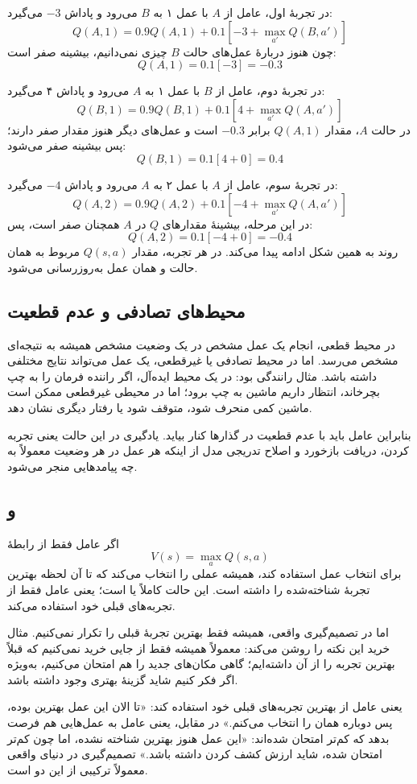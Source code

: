 در تجربهٔ اول، عامل از \(A\) با عمل ۱ به \(B\) می‌رود و پاداش \(-3\) می‌گیرد:
\[
Q(A,1)=0.9Q(A,1)+0.1[-3+\max_{a'}Q(B,a')]
\]
چون هنوز دربارهٔ عمل‌های حالت \(B\) چیزی نمی‌دانیم، بیشینه صفر است:
\[
Q(A,1)=0.1[-3]=-0.3
\]

در تجربهٔ دوم، عامل از \(B\) با عمل ۱ به \(A\) می‌رود و پاداش ۴ می‌گیرد:
\[
Q(B,1)=0.9Q(B,1)+0.1[4+\max_{a'}Q(A,a')]
\]
در حالت \(A\)، مقدار \(Q(A,1)\) برابر \(-0.3\) است و عمل‌های دیگر هنوز مقدار صفر دارند؛ پس بیشینه صفر می‌شود:
\[
Q(B,1)=0.1[4+0]=0.4
\]

در تجربهٔ سوم، عامل از \(A\) با عمل ۲ به \(A\) می‌رود و پاداش \(-4\) می‌گیرد:
\[
Q(A,2)=0.9Q(A,2)+0.1[-4+\max_{a'}Q(A,a')]
\]
در این مرحله، بیشینهٔ مقدارهای \(Q\) در \(A\) همچنان صفر است، پس:
\[
Q(A,2)=0.1[-4+0]=-0.4
\]
روند به همین شکل ادامه پیدا می‌کند. در هر تجربه، مقدار \(Q(s,a)\) مربوط به همان حالت و همان عمل به‌روزرسانی می‌شود.

\subsection{محیط‌های تصادفی و عدم قطعیت}
در محیط قطعی، انجام یک عمل مشخص در یک وضعیت مشخص همیشه به نتیجه‌ای مشخص می‌رسد. اما در محیط تصادفی یا غیرقطعی، یک عمل می‌تواند نتایج مختلفی داشته باشد. مثال رانندگی بود: در یک محیط ایده‌آل، اگر راننده فرمان را به چپ بچرخاند، انتظار داریم ماشین به چپ برود؛ اما در محیطی غیرقطعی ممکن است ماشین کمی منحرف شود، متوقف شود یا رفتار دیگری نشان دهد.

بنابراین عامل باید با عدم قطعیت در گذارها کنار بیاید. یادگیری در این حالت یعنی تجربه کردن، دریافت بازخورد و اصلاح تدریجی مدل از اینکه هر عمل در هر وضعیت معمولاً به چه پیامدهایی منجر می‌شود.

\subsection{ و }
اگر عامل فقط از رابطهٔ
\[
V(s)=\max_a Q(s,a)
\]
برای انتخاب عمل استفاده کند، همیشه عملی را انتخاب می‌کند که تا آن لحظه بهترین تجربهٔ شناخته‌شده را داشته است. این حالت کاملاً  یا  است؛ یعنی عامل فقط از تجربه‌های قبلی خود استفاده می‌کند.

اما در تصمیم‌گیری واقعی، همیشه فقط بهترین تجربهٔ قبلی را تکرار نمی‌کنیم. مثال خرید این نکته را روشن می‌کند: معمولاً همیشه فقط از جایی خرید نمی‌کنیم که قبلاً بهترین تجربه را از آن داشته‌ایم؛ گاهی مکان‌های جدید را هم امتحان می‌کنیم، به‌ویژه اگر فکر کنیم شاید گزینهٔ بهتری وجود داشته باشد.

 یعنی عامل از بهترین تجربه‌های قبلی خود استفاده کند: «تا الان این عمل بهترین بوده، پس دوباره همان را انتخاب می‌کنم.» در مقابل،  یعنی عامل به عمل‌هایی هم فرصت بدهد که کم‌تر امتحان شده‌اند: «این عمل هنوز بهترین شناخته نشده، اما چون کم‌تر امتحان شده، شاید ارزش کشف کردن داشته باشد.» تصمیم‌گیری در دنیای واقعی معمولاً ترکیبی از این دو است.

